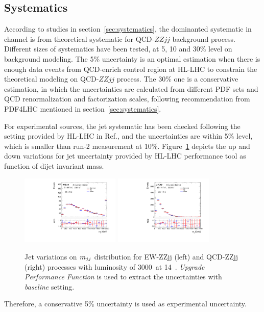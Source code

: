 \subsection{Systematics}

According to studies in section~\ref{sec:systematics}, the dominanted systematic in \llll channel is from theoretical systematic for QCD-$ZZjj$ background process.
Different sizes of systematics have been tested, at 5, 10 and 30\% level on background modeling.
The 5\% uncertainty is an optimal estimation when there is enough data events from QCD-enrich control region at HL-LHC to constrain the theoretical modeling on QCD-$ZZjj$ process.
The 30\% one is a conservative estimation, in which the uncertainties are calculated from different PDF sets and QCD renormalization and factorization
scales, following recommendation from PDF4LHC mentioned in section~\ref{sec:systematics}.

For experimental sources, the jet systematic has been checked following the setting provided by HL-LHC in Ref.\cite{ATL-PHYS-PUB-2016-026},
and the uncertainties are within 5\% level, which is smaller than run-2 measurement at 10\%.
Figure~\ref{fig:jet_uncer} depicts the up and down variations for jet uncertainty provided by HL-LHC performance tool as function of dijet invariant mass.
\begin{figure}
  \centering
  \includegraphics[width=0.42\textwidth]{figures/VBSZZ/hllhc/Uncer_baseline_TagJJM_ewk_linear.pdf}
  \includegraphics[width=0.42\textwidth]{figures/VBSZZ/hllhc/Uncer_baseline_TagJJM_qcd_linear.pdf}
  \caption{Jet variations on $m_{jj}$ distribution for EW-ZZjj (left) and QCD-ZZjj (right) processes
           with luminosity of 3000~\ifb at 14~\tev.
	   \textit{Upgrade Performance Function} is used to extract the uncertainties with \textit{baseline} setting.}
  \label{fig:jet_uncer}
\end{figure}
Therefore, a conservative 5\% uncertainty is used as experimental uncertainty.

